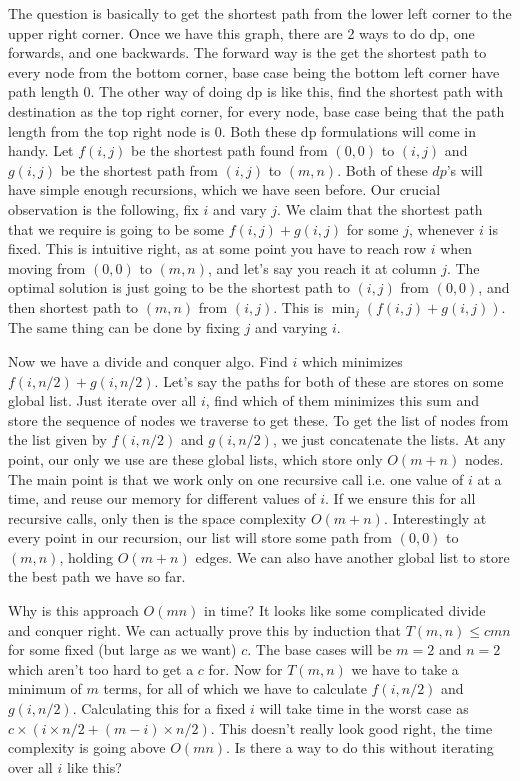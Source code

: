 \documentclass[12pt]{report}
\begin{document}
\begin{enumerate}[label=\textbf{\arabic*.}]
  The question is basically to get the shortest path from the lower left corner to the upper right corner. Once we have this graph, there are 2 ways to do dp, one forwards, and one backwards. The forward way is the get the shortest path
  to every node from the bottom corner, base case being the bottom left corner have path length 0. The other way of doing dp is like this, find the shortest path with destination as the top right corner, for every node, base case being that
  the path length from the top right node is 0. Both these dp formulations will come in handy. Let $f(i,j)$ be the shortest path found from $(0,0)$ to $(i,j)$ and $g(i,j)$ be the shortest path from $(i,j)$ to $(m,n)$. Both of these $dp$'s will
  have simple enough recursions, which we have seen before. Our crucial observation is the following, fix $i$ and vary $j$. We claim that the shortest path that we require is going to be some $f(i,j) + g(i,j)$ for some $j$, whenever $i$ is
  fixed. This is intuitive right, as at some point you have to reach row $i$ when moving from $(0,0)$ to $(m,n)$, and let's say you reach it at column $j$. The optimal solution is just going to be the shortest path to $(i,j)$ from $(0,0)$,
  and then shortest path to $(m,n)$ from $(i,j)$. This is $\min_j (f(i,j) + g(i,j))$. The same thing can be done by fixing $j$ and varying $i$.

  Now we have a divide and conquer algo. Find $i$ which minimizes $f(i,n/2) + g(i,n/2)$. Let's say the paths for both of these are stores on some global list. Just iterate over all $i$, find which of them minimizes this sum and store the 
  sequence of nodes we traverse to get these. To get the list of nodes from the list given by $f(i,n/2)$ and $g(i,n/2)$, we just concatenate the lists. At any point, our only we use are these global lists, which store only $O(m+n)$ nodes.
  The main point is that we work only on one recursive call i.e. one value of $i$ at a time, and reuse our memory for different values of $i$. If we ensure this for all recursive calls, only then is the space complexity $O(m+n)$. Interestingly
  at every point in our recursion, our list will store some path from $(0,0)$ to $(m,n)$, holding $O(m+n)$ edges. We can also have another global list to store the best path we have so far.

  Why is this approach $O(mn)$ in time? It looks like some complicated divide and conquer right. We can actually prove this by induction that $T(m,n) \leq cmn$ for some fixed (but large as we want) $c$. The base cases will be $m = 2$ and $n = 2$ 
  which aren't too hard to get a $c$ for. Now for $T(m,n)$ we have to take a minimum of $m$ terms, for all of which we have to calculate $f(i, n/2)$ and $g(i, n/2)$. Calculating this for a fixed $i$ will take time in the worst case as
  $c \times (i \times n/2 + (m-i) \times n/2)$. This doesn't really look good right, the time complexity is going above $O(mn)$. Is there a way to do this without iterating over all $i$ like this?


\end{enumerate}
\end{document}
